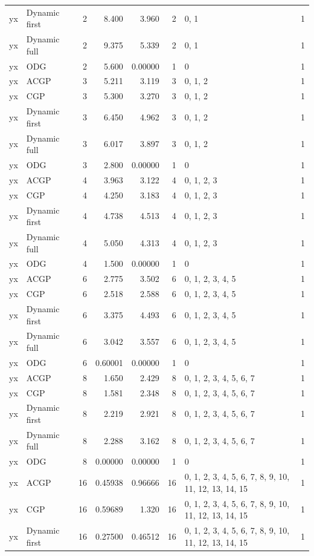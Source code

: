 \documentclass[10pt,a4paper]{article}
\begin{document}
\begin{longtable}{@{}p{23mm}p{29mm}rrrrp{36mm}r@{}}
yx & Dynamic first & 2 & 8.400 & 3.960 & 2 & 0, 1 & 1 \\
yx & Dynamic full & 2 & 9.375 & 5.339 & 2 & 0, 1 & 1 \\
yx & ODG & 2 & 5.600 & 0.00000 & 1 & 0 & 1 \\
yx & ACGP & 3 & 5.211 & 3.119 & 3 & 0, 1, 2 & 1 \\
yx & CGP & 3 & 5.300 & 3.270 & 3 & 0, 1, 2 & 1 \\
yx & Dynamic first & 3 & 6.450 & 4.962 & 3 & 0, 1, 2 & 1 \\
yx & Dynamic full & 3 & 6.017 & 3.897 & 3 & 0, 1, 2 & 1 \\
yx & ODG & 3 & 2.800 & 0.00000 & 1 & 0 & 1 \\
yx & ACGP & 4 & 3.963 & 3.122 & 4 & 0, 1, 2, 3 & 1 \\
yx & CGP & 4 & 4.250 & 3.183 & 4 & 0, 1, 2, 3 & 1 \\
yx & Dynamic first & 4 & 4.738 & 4.513 & 4 & 0, 1, 2, 3 & 1 \\
yx & Dynamic full & 4 & 5.050 & 4.313 & 4 & 0, 1, 2, 3 & 1 \\
yx & ODG & 4 & 1.500 & 0.00000 & 1 & 0 & 1 \\
yx & ACGP & 6 & 2.775 & 3.502 & 6 & 0, 1, 2, 3, 4, 5 & 1 \\
yx & CGP & 6 & 2.518 & 2.588 & 6 & 0, 1, 2, 3, 4, 5 & 1 \\
yx & Dynamic first & 6 & 3.375 & 4.493 & 6 & 0, 1, 2, 3, 4, 5 & 1 \\
yx & Dynamic full & 6 & 3.042 & 3.557 & 6 & 0, 1, 2, 3, 4, 5 & 1 \\
yx & ODG & 6 & 0.60001 & 0.00000 & 1 & 0 & 1 \\
yx & ACGP & 8 & 1.650 & 2.429 & 8 & 0, 1, 2, 3, 4, 5, 6, 7 & 1 \\
yx & CGP & 8 & 1.581 & 2.348 & 8 & 0, 1, 2, 3, 4, 5, 6, 7 & 1 \\
yx & Dynamic first & 8 & 2.219 & 2.921 & 8 & 0, 1, 2, 3, 4, 5, 6, 7 & 1 \\
yx & Dynamic full & 8 & 2.288 & 3.162 & 8 & 0, 1, 2, 3, 4, 5, 6, 7 & 1 \\
yx & ODG & 8 & 0.00000 & 0.00000 & 1 & 0 & 1 \\
yx & ACGP & 16 & 0.45938 & 0.96666 & 16 & 0, 1, 2, 3, 4, 5, 6, 7, 8, 9, 10, 11, 12, 13, 14, 15 & 1 \\
yx & CGP & 16 & 0.59689 & 1.320 & 16 & 0, 1, 2, 3, 4, 5, 6, 7, 8, 9, 10, 11, 12, 13, 14, 15 & 1 \\
yx & Dynamic first & 16 & 0.27500 & 0.46512 & 16 & 0, 1, 2, 3, 4, 5, 6, 7, 8, 9, 10, 11, 12, 13, 14, 15 & 1 \\

\end{longtable}
\end{document}
